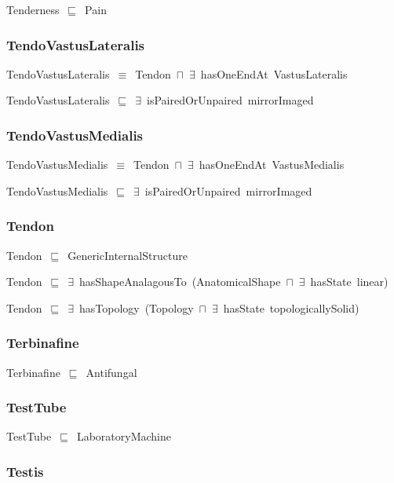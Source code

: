 \documentclass{article}
\begin{document}
Tenderness~\ensuremath{\sqsubseteq}~Pain~

\subsubsection*{TendoVastusLateralis}

TendoVastusLateralis~\ensuremath{\equiv}~Tendon~\ensuremath{\sqcap}~\ensuremath{\exists}~hasOneEndAt~VastusLateralis

TendoVastusLateralis~\ensuremath{\sqsubseteq}~\ensuremath{\exists}~isPairedOrUnpaired~mirrorImaged~

\subsubsection*{TendoVastusMedialis}

TendoVastusMedialis~\ensuremath{\equiv}~Tendon~\ensuremath{\sqcap}~\ensuremath{\exists}~hasOneEndAt~VastusMedialis

TendoVastusMedialis~\ensuremath{\sqsubseteq}~\ensuremath{\exists}~isPairedOrUnpaired~mirrorImaged~

\subsubsection*{Tendon}

Tendon~\ensuremath{\sqsubseteq}~GenericInternalStructure~

Tendon~\ensuremath{\sqsubseteq}~\ensuremath{\exists}~hasShapeAnalagousTo~(AnatomicalShape~\ensuremath{\sqcap}~\ensuremath{\exists}~hasState~linear)~

Tendon~\ensuremath{\sqsubseteq}~\ensuremath{\exists}~hasTopology~(Topology~\ensuremath{\sqcap}~\ensuremath{\exists}~hasState~topologicallySolid)~

\subsubsection*{Terbinafine}

Terbinafine~\ensuremath{\sqsubseteq}~Antifungal~

\subsubsection*{TestTube}

TestTube~\ensuremath{\sqsubseteq}~LaboratoryMachine~

\subsubsection*{Testis}
\end{document}
